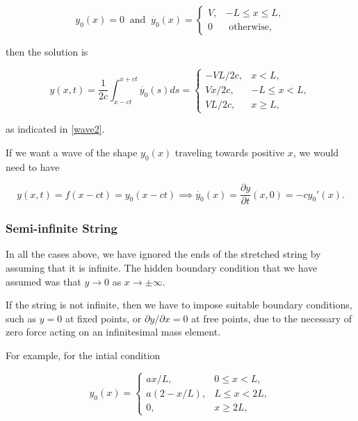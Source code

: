 \documentclass[a4paper,12pt]{report}
\begin{document}
\begin{equation}
	y_0 (x) = 0 ~\text { and }~ 
	\dot{y_0 }(x) = \begin{cases}
		V,& -L \le x \le L,\\
		0 &\text{ otherwise} ,
	\end{cases}
\end{equation}

then the solution is 

\begin{equation}
	y(x,t) = \frac{1}{2c} \int_{x-ct}^{x+ct} \dot{y_0 }(s)ds = \begin{cases}
		 -VL/2c ,& x<L,\\
		 Vx/2c ,& -L \le x <L,\\
		 VL/2c,& x \ge L,
	\end{cases} 
\end{equation}

as indicated in \cref{wave2}. 


If we want a wave of the shape \(y_0 (x)\) traveling towards positive \(x\), we would need to have 

\begin{equation}
	y(x,t) = f(x-ct) = y_0 (x-ct) \implies \dot{y_0 }(x) = \frac{\partial y}{\partial t}(x,0)  = -cy_0 '(x).  
\end{equation}

\subsubsection{Semi-infinite String}

In all the cases above, we have ignored the ends of the stretched string by assuming that it is infinite. The hidden boundary condition that we have assumed was that \(y \to 0\) as \(x \to \pm \infty\).

If the string is not infinite, then we have to impose suitable boundary conditions, such as \(y=0\) at fixed points, or \( \partial y/\partial x = 0\) at free points, due to the necessary of zero force acting on an infinitesimal mass element.  

For example, for the intial condition 

\begin{equation}
	y_0(x) =
\begin{cases}
    ax /L,& 0 \leq x < L, \\
    a\left(2 - x/L\right),& L \leq x < 2L, \\
    0,&x \geq 2L,
\end{cases}
\end{equation}
\end{document}

